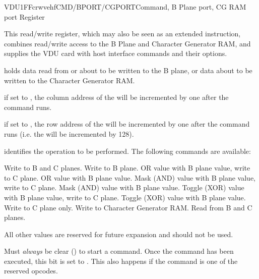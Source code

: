 \begin{ioport}{VDU}{1FF}{crwvehf}{CMD/BPORT/CGPORT}{Command, B Plane port, CG RAM port Register}

  This read/write register, which may also be seen as an extended instruction,
  combines read/write access to the B Plane and Character Generator RAM, and
  supplies the VDU card with host interface commands and their options.

  \begin{cbitfield}[8]
  \end{cbitfield}

  \begin{description}
     holds data read from or about to be written to the
    B plane, or data about to be written to the Character Generator RAM.
    
     if set to , the column address of the 
    will be incremented by one after the command runs.
    
     if set to , the row address of the 
    will be incremented by one after the command runs (i.e. the  will
    be incremented by 128).
    
     identifies the operation to be performed. The
    following commands are available:
    \begin{description}
       Write to B and C planes.
       Write to B plane.
       OR value with B plane value, write to C plane.
       OR value with B plane value.
       Mask (AND) value with B plane value, write to C plane.
       Mask (AND) value with B plane value.
       Toggle (XOR) value with B plane value, write to C plane.
       Toggle (XOR) value with B plane value.
       Write to C plane only.
       Write to Character Generator RAM.
       Read from B and C planes.
    \end{description}

    All other values are reserved for future expansion and should not be used.

     Must {\em always\/} be clear () to start a
    command. Once the command has been executed, this bit is set to .
    This also happens if the command is one of the reserved opcodes.
  \end{description}


\end{ioport}

